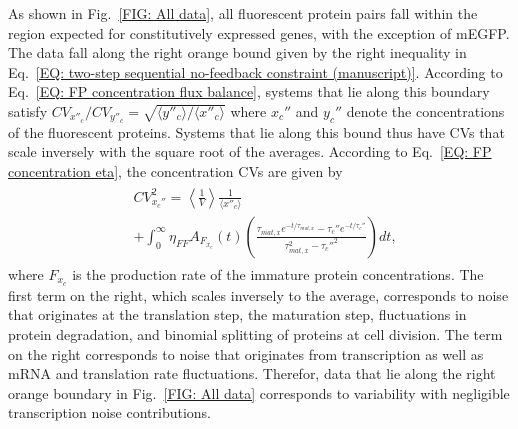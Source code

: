 \documentclass[%
 reprint,prx,
superscriptaddress,
%
%
%
%
%
%
%
%
%
 amsmath,amssymb,
 aps,
%
%
%
%
%
%
]{revtex4-2}
\begin{document}
{{{
As shown in Fig.~\ref{FIG: All data}, all fluorescent protein pairs fall within the region expected for constitutively expressed genes, with the exception of mEGFP. The data fall along the right orange bound given by the right inequality in Eq.~\eqref{EQ: two-step sequential no-feedback constraint (manuscript)}. According to Eq.~\eqref{EQ: FP concentration flux balance}, systems that lie along this boundary satisfy $CV_{x''_{c}}/CV_{y''_{c}} = \sqrt{\langle y''_{c} \rangle / \langle x''_{c} \rangle}$
where $x_{c}''$ and $y_{c}''$ denote the concentrations of the fluorescent proteins. Systems that lie along this bound thus have CVs that scale inversely with the square root of the averages. According to Eq.~\eqref{EQ: FP concentration eta}, the concentration CVs are given by
\begin{align}
\begin{split}
    &CV_{x_{c}''}^{2} = \left \langle \frac{1}{V}\right \rangle \frac{1}{\langle x''_{c}\rangle}\\
    &+   \int_{0}^{\infty}\eta_{FF}A_{F_{x_{c}}}(t) \left( \frac{\tau_{mat,x}e^{-t/\tau_{mat,x}} - \tau_{c}''e^{-t/\tau_{c}''} }{\tau_{mat,x}^{2} - \tau_{c}''^2} \right)dt,
\end{split}
    \label{EQ: CV concentrations general}
\end{align}
where $F_{x_{c}}$ is the production rate of the immature protein concentrations. The first term on the right, which scales inversely to the average, corresponds to noise that originates at the translation step, the maturation step, fluctuations in protein degradation, and binomial splitting of proteins at cell division. The term on the right corresponds to noise that originates from transcription as well as mRNA and translation rate fluctuations. Therefor, data that lie along the right orange boundary in Fig.~\ref{FIG: All data} corresponds to variability with negligible transcription noise contributions. 
}




}}
\end{document}
